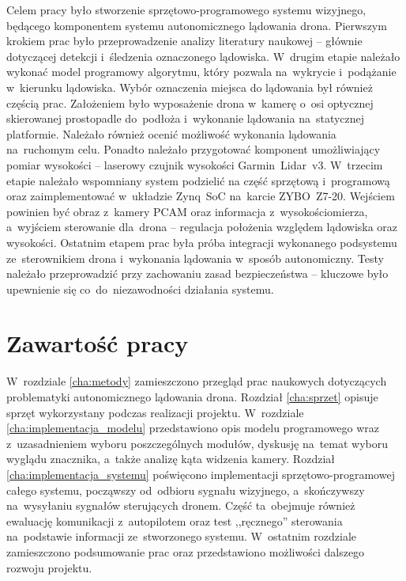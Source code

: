 Celem pracy było stworzenie sprzętowo-programowego systemu wizyjnego, będącego komponentem systemu autonomicznego lądowania drona. 
Pierwszym krokiem prac było przeprowadzenie analizy literatury naukowej -- głównie dotyczącej detekcji i~śledzenia oznaczonego lądowiska. 
W~drugim etapie należało wykonać model programowy algorytmu, który pozwala na~wykrycie i~podążanie w~kierunku  lądowiska. 
Wybór oznaczenia miejsca do lądowania był również częścią prac. 
Założeniem było wyposażenie drona w~kamerę o~osi optycznej skierowanej prostopadle do~podłoża i~wykonanie lądowania na~statycznej platformie. 
Należało również ocenić możliwość wykonania lądowania na~ruchomym celu.
Ponadto należało przygotować komponent umożliwiający pomiar wysokości -- laserowy czujnik wysokości Garmin~Lidar~v3. 
W~trzecim etapie należało wspomniany system podzielić na część sprzętową i~programową oraz zaimplementować w~układzie Zynq~SoC na~karcie ZYBO~Z7-20. 
Wejściem powinien być obraz z~kamery PCAM oraz informacja z~wysokościomierza, a~wyjściem sterowanie dla~drona -- regulacja położenia względem lądowiska oraz wysokości.
Ostatnim etapem prac była próba integracji wykonanego podsystemu ze~sterownikiem drona i~wykonania lądowania w~sposób autonomiczny. 
Testy należało przeprowadzić przy zachowaniu zasad bezpieczeństwa -- kluczowe było upewnienie się co~do~niezawodności działania systemu.




\section{Zawartość pracy}
\label{sec:zawartoscPracy}

W~rozdziale \ref{cha:metody} zamieszczono przegląd prac naukowych dotyczących problematyki autonomicznego lądowania drona. 
Rozdział \ref{cha:sprzet} opisuje sprzęt wykorzystany podczas realizacji projektu. 
W~rozdziale \ref{cha:implementacja_modelu} przedstawiono opis modelu programowego wraz z~uzasadnieniem wyboru poszczególnych modułów, dyskusję na~temat wyboru wyglądu znacznika, a~także analizę kąta widzenia kamery. 
Rozdział \ref{cha:implementacja_systemu} poświęcono implementacji sprzętowo-programowej całego systemu, począwszy od~odbioru sygnału wizyjnego, a~skończywszy na~wysyłaniu sygnałów sterujących dronem. 
Część ta~obejmuje również ewaluację komunikacji z~autopilotem oraz test ,,ręcznego'' sterowania na~podstawie informacji ze~stworzonego systemu. 
W~ostatnim rozdziale zamieszczono podsumowanie prac oraz przedstawiono możliwości dalszego rozwoju projektu.

